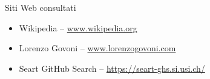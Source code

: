 \cleardoublepage
{}
{}
\nocite{*}



\vspace{2.5cm}
\begin{Large}Siti Web consultati\end{Large}
\begin{itemize}
    \item Wikipedia -- \url{www.wikipedia.org}
    \item Lorenzo Govoni -- \url{www.lorenzogovoni.com}
    \item Seart GitHub Search -- \url{https://seart-ghs.si.usi.ch/}
\end{itemize}

